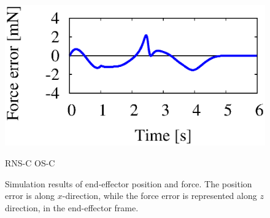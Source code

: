 \begin{figure}[t]
\begin{minipage}[h]{0.40\linewidth}
  \end{minipage}
  \begin{minipage}[h]{0.40\linewidth}
    \centering
    \includegraphics[width=1.0\linewidth]{fig/chapter6/results/planar/OSF/3RFIX_OSF_U08_force_err.eps}
  \end{minipage}
  \footnotesize\par{RNS-C \hspace{13em} OS-C}
  \vspace{1em}
  \caption{Simulation results of end-effector position and force.
  The position error is along $x$-direction, while the force error is represented along $z$ direction,
  in the end-effector frame.}
  \label{fig:RES_MF_3R_TASK}
\end{figure}
%
%
